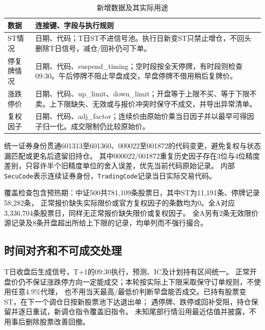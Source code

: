 \documentclass[UTF8,zihao=-4,fontset=fandol]{ctexart}
\begin{document}
\begin{table}[H]\centering\small
\caption{新增数据及其实际用途}
\begin{tabularx}{\linewidth}{p{27mm}X}\toprule
数据 & 连接键、字段与执行规则\\\midrule
ST情况 & 日期、代码；T日ST不进信号池。执行日新变ST只禁止增仓，不回头删除T日信号，减仓/回补仍可下单。\\
停复牌情况 & 日期、代码、suspend\_timing；空时段按全天停牌，有时段则检查09:30。午后停牌不阻止早盘成交，早盘停牌不借用稍后复牌价。\\
涨跌停价 & 日期、代码、up\_limit、down\_limit；开盘等于上限不买、等于下限不卖。上下限缺失、无效或与报价冲突时保守不成交，并导出异常清单。\\
复权因子 & 日期、代码、adj\_factor；连续价由原始价乘当日因子并以最早可得因子归一化。成交限制仍比较原始价。\\\bottomrule
\end{tabularx}\end{table}

统一证券身份贯通601313至601360、000022至001872的代码变更，避免复权与状态漏匹配或更名后遗留旧持仓。
其中000022/001872重复历史因子存在3位与4位精度差别，只容许半个旧精度单位的舍入误差，优先当前代码原始记录。
内部\texttt{SecuCode}表示连续证券身份，\texttt{TradingCode}记录当日实际交易代码。

覆盖检查包含预热期：中证500共781,109条股票日，其中ST为11,191条、停牌记录58,282条，
正常报价缺失实际限价或官方复权因子的条数均为0。全A对应3,336,704条股票日，同样无正常报价缺失限价或复权因子。
全A另有2条无效限价源记录及8条开盘超出所给上下限的记录，均单列而不强行撮合。

\subsection{时间对齐和不可成交处理}
T日收盘后生成信号，T+1的09:30执行，预测、IC及计划持有区间统一。
正常开盘价仍不保证涨跌停方向一定能成交；本轮按实际上下限采取保守订单规则，不使用任意4.9\%代理，
也不用当天最高/最低价判断早盘能否成交。已持有股票变ST，在下一个调仓日按新股票池下达退出单；
遇停牌、跌停或回补受阻，持仓保留并逐日重试，新调仓指令覆盖旧指令。
未知尾部行情沿用最近估值并披露，不用事后删除股票改善回撤。

\clearpage
\end{document}

